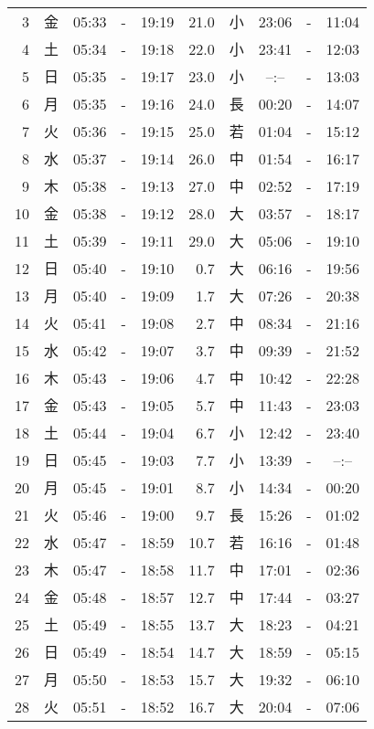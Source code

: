 \documentclass[a4j,10pt]{jsarticle}
\begin{document}
\begin{center}
\begin{table}[ht]
\begin{center}
\begin{tabular}{|rc|ccc|rc|ccc|}
  3 & 金 & 05:33 &-& 19:19 & 21.0 & 小 & 23:06 &-& 11:04 \\
  4 & 土 & 05:34 &-& 19:18 & 22.0 & 小 & 23:41 &-& 12:03 \\
  5 & 日 & 05:35 &-& 19:17 & 23.0 & 小 & --:-- &-& 13:03 \\
  6 & 月 & 05:35 &-& 19:16 & 24.0 & 長 & 00:20 &-& 14:07 \\
  7 & 火 & 05:36 &-& 19:15 & 25.0 & 若 & 01:04 &-& 15:12 \\
  8 & 水 & 05:37 &-& 19:14 & 26.0 & 中 & 01:54 &-& 16:17 \\
  9 & 木 & 05:38 &-& 19:13 & 27.0 & 中 & 02:52 &-& 17:19 \\
 10 & 金 & 05:38 &-& 19:12 & 28.0 & 大 & 03:57 &-& 18:17 \\
 11 & 土 & 05:39 &-& 19:11 & 29.0 & 大 & 05:06 &-& 19:10 \\
 12 & 日 & 05:40 &-& 19:10 &  0.7 & 大 & 06:16 &-& 19:56 \\
 13 & 月 & 05:40 &-& 19:09 &  1.7 & 大 & 07:26 &-& 20:38 \\
 14 & 火 & 05:41 &-& 19:08 &  2.7 & 中 & 08:34 &-& 21:16 \\
 15 & 水 & 05:42 &-& 19:07 &  3.7 & 中 & 09:39 &-& 21:52 \\
 16 & 木 & 05:43 &-& 19:06 &  4.7 & 中 & 10:42 &-& 22:28 \\
 17 & 金 & 05:43 &-& 19:05 &  5.7 & 中 & 11:43 &-& 23:03 \\
 18 & 土 & 05:44 &-& 19:04 &  6.7 & 小 & 12:42 &-& 23:40 \\
 19 & 日 & 05:45 &-& 19:03 &  7.7 & 小 & 13:39 &-& --:-- \\
 20 & 月 & 05:45 &-& 19:01 &  8.7 & 小 & 14:34 &-& 00:20 \\
 21 & 火 & 05:46 &-& 19:00 &  9.7 & 長 & 15:26 &-& 01:02 \\
 22 & 水 & 05:47 &-& 18:59 & 10.7 & 若 & 16:16 &-& 01:48 \\
 23 & 木 & 05:47 &-& 18:58 & 11.7 & 中 & 17:01 &-& 02:36 \\
 24 & 金 & 05:48 &-& 18:57 & 12.7 & 中 & 17:44 &-& 03:27 \\
 25 & 土 & 05:49 &-& 18:55 & 13.7 & 大 & 18:23 &-& 04:21 \\
 26 & 日 & 05:49 &-& 18:54 & 14.7 & 大 & 18:59 &-& 05:15 \\
 27 & 月 & 05:50 &-& 18:53 & 15.7 & 大 & 19:32 &-& 06:10 \\
 28 & 火 & 05:51 &-& 18:52 & 16.7 & 大 & 20:04 &-& 07:06 \\

\end{tabular}
\end{center}
\end{table}
\end{center}
\end{document}

